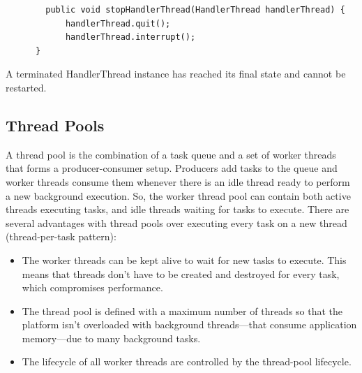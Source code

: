 \begin{itemize}
	\begin{lstlisting}
		public void stopHandlerThread(HandlerThread handlerThread) {
			handlerThread.quit();
			handlerThread.interrupt();
	  }
	\end{lstlisting}
	A terminated HandlerThread instance has reached its final state and cannot be restarted.
\end{itemize}

\subsection{Thread Pools}
A thread pool is the combination of a task queue and a set of worker threads that forms a producer-consumer setup. Producers add tasks to the queue and worker threads consume them whenever there is an idle thread ready to perform a new background execution. So, the worker thread pool can contain both active threads executing tasks, and idle threads waiting for tasks to execute.
There are several advantages with thread pools over executing every task on a new thread (thread-per-task pattern):
\begin{itemize}
	\item The worker threads can be kept alive to wait for new tasks to execute. This means that threads don’t have to be created and destroyed for every task, which compromises performance.
	\item The thread pool is defined with a maximum number of threads so that the platform isn’t overloaded with background threads—that consume application memory—due to many background tasks.
	\item The lifecycle of all worker threads are controlled by the thread-pool lifecycle.
\end{itemize}

